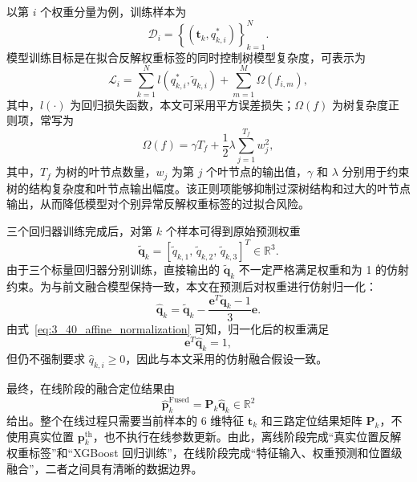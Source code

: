 以第 \(i\) 个权重分量为例，训练样本为
\begin{equation}
\mathcal{D}_i
=
\left\{
\left(\mathbf{t}_k,q_{k,i}^{\ast}\right)
\right\}_{k=1}^{N}.
\label{eq:3_36_xgb_single_output_dataset}
\end{equation}
模型训练目标是在拟合反解权重标签的同时控制树模型复杂度，可表示为
\begin{equation}
\mathcal{L}_i
=
\sum_{k=1}^{N}
l
\left(
q_{k,i}^{\ast},
\tilde{q}_{k,i}
\right)
+
\sum_{m=1}^{M}
\Omega
\left(
f_{i,m}
\right),
\label{eq:3_37_xgb_objective}
\end{equation}
其中，\(l(\cdot)\) 为回归损失函数，本文可采用平方误差损失；\(\Omega(f)\) 为树复杂度正则项，常写为
\begin{equation}
\Omega(f)
=
\gamma T_f
+
\frac{1}{2}
\lambda
\sum_{j=1}^{T_f}
w_j^2,
\label{eq:3_38_xgb_regularization}
\end{equation}
其中，\(T_f\) 为树的叶节点数量，\(w_j\) 为第 \(j\) 个叶节点的输出值，\(\gamma\) 和 \(\lambda\) 分别用于约束树的结构复杂度和叶节点输出幅度。该正则项能够抑制过深树结构和过大的叶节点输出，从而降低模型对个别异常反解权重标签的过拟合风险。

三个回归器训练完成后，对第 \(k\) 个样本可得到原始预测权重
\begin{equation}
\tilde{\mathbf{q}}_k
=
\left[
\tilde{q}_{k,1},\,
\tilde{q}_{k,2},\,
\tilde{q}_{k,3}
\right]^T
\in\mathbb{R}^{3}.
\label{eq:3_39_raw_predicted_weight}
\end{equation}
由于三个标量回归器分别训练，直接输出的 \(\tilde{\mathbf{q}}_k\) 不一定严格满足权重和为 1 的仿射约束。为与前文融合模型保持一致，本文在预测后对权重进行仿射归一化：
\begin{equation}
\hat{\mathbf{q}}_k
=
\tilde{\mathbf{q}}_k
-
\frac{
\mathbf{e}^T\tilde{\mathbf{q}}_k-1
}{3}
\mathbf{e}.
\label{eq:3_40_affine_normalization}
\end{equation}
由式~\eqref{eq:3_40_affine_normalization} 可知，归一化后的权重满足
\begin{equation}
\mathbf{e}^T\hat{\mathbf{q}}_k=1,
\label{eq:3_41_predicted_weight_constraint}
\end{equation}
但仍不强制要求 \(\hat{q}_{k,i}\ge0\)，因此与本文采用的仿射融合假设一致。

最终，在线阶段的融合定位结果由
\begin{equation}
\hat{\mathbf{p}}_k^{\mathrm{Fused}}
=
\mathbf{P}_k\hat{\mathbf{q}}_k
\in\mathbb{R}^{2}
\label{eq:3_42_xgb_online_fusion}
\end{equation}
给出。整个在线过程只需要当前样本的 6 维特征 \(\mathbf{t}_k\) 和三路定位结果矩阵 \(\mathbf{P}_k\)，不使用真实位置 \(\mathbf{p}_k^{\mathrm{th}}\)，也不执行在线参数更新。由此，离线阶段完成“真实位置反解权重标签”和“XGBoost 回归训练”，在线阶段完成“特征输入、权重预测和位置级融合”，二者之间具有清晰的数据边界。

